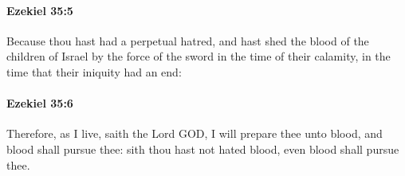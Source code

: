 		\paragraph{Ezekiel 35:5} %
			\label{EZEKIEL-35-5}

			Because thou hast had a perpetual hatred, and hast shed the blood of the children of Israel by the force of the sword in the time of their calamity, in the time that their iniquity had an end:


		\paragraph{Ezekiel 35:6} %
			\label{EZEKIEL-35-6}

			Therefore, as I live, saith the Lord GOD, I will prepare thee unto blood, and blood shall pursue thee: sith thou hast not hated blood, even blood shall pursue thee.


